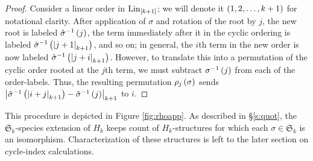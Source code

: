 \documentclass[sectionflow,singlespace,twoside]{brandiss} %
\numberwithin{section}{chapter}
\numberwithin{figure}{chapter}
\begin{document}
\begin{proof}
  Consider a linear order in $\operatorname{Lin}_{\left[ {k+1} \right]}$; we will denote it $\left( {1, 2, \dots, k+1} \right)$ for notational clarity.
  After application of $\sigma$ and rotation of the root by $j$, the new root is labeled $\hat{\sigma}^{-1} \left( {j} \right)$, the term immediately after it in the cyclic ordering is labeled $\hat{\sigma}^{-1} \left( {\left\vert {j+1} \right\vert_{k+1}} \right)$, and so on; in general, the $i$th term in the new order is now labeled $\hat{\sigma}^{-1} \left( {\left\vert {j+i} \right\vert_{k+1}} \right)$.
  However, to translate this into a permutation of the cyclic order rooted at the $j$th term, we must subtract $\sigma^{-1} \left( {j} \right)$ from each of the order-labels.
  Thus, the resulting permutation $\rho_{j} \left( {\sigma} \right)$ sends $\left\vert {\hat{\sigma}^{-1} \ensuremath{\left( {\left\vert {i + j} \right\vert_{k+1}} \right)} - \hat{\sigma}^{-1} \ensuremath{\left( {j} \right)}} \right\vert_{k+1}$ to $i$.
\end{proof}

This procedure is depicted in Figure \ref{fig:rhoapp}.
As described in \S \ref{s:quot}, the $\mathfrak{S}_{k}$-species extension of $H_{k}$ keeps count of $H_{k}$-structures for which each $\sigma \in \mathfrak{S}_{k}$ is an isomorphism.
Characterization of these structures is left to the later section on cycle-index calculations.
\end{document}
